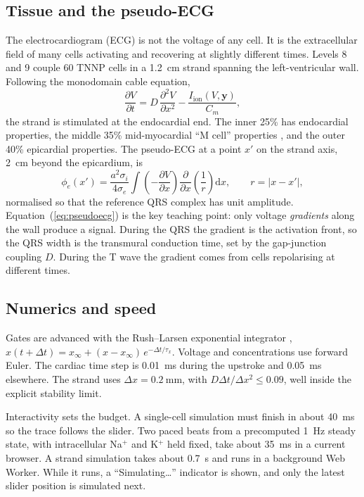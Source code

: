 \documentclass[11pt,a4paper]{article}
\begin{document}
\subsection{Tissue and the pseudo-ECG}
The electrocardiogram (ECG) is not the voltage of any cell. It is the extracellular field of many cells activating and recovering at slightly different times. Levels 8 and 9 couple 60 TNNP cells in a \SI{1.2}{\centi\metre} strand spanning the left-ventricular wall. Following the monodomain cable equation,
\begin{equation}
\frac{\partial V}{\partial t} = D\,\frac{\partial^2 V}{\partial x^2} - \frac{I_{\mathrm{ion}}(V,\mathbf{y})}{C_m},
\end{equation}
the strand is stimulated at the endocardial end. The inner 25\% has endocardial properties, the middle 35\% mid-myocardial ``M cell'' properties \cite{SicouriAntzelevitch1991}, and the outer 40\% epicardial properties. The pseudo-ECG at a point $x'$ on the strand axis, \SI{2}{\centi\metre} beyond the epicardium, is \cite{GimaRudy2002}
\begin{equation}
\phi_e(x') = \frac{a^2\sigma_i}{4\sigma_e}\int \left(-\frac{\partial V}{\partial x}\right)\frac{\partial}{\partial x}\!\left(\frac{1}{r}\right)\mathrm{d}x, \qquad r = |x - x'|,
\label{eq:pseudoecg}
\end{equation}
normalised so that the reference QRS complex has unit amplitude. Equation~(\ref{eq:pseudoecg}) is the key teaching point: only voltage \emph{gradients} along the wall produce a signal. During the QRS the gradient is the activation front, so the QRS width is the transmural conduction time, set by the gap-junction coupling $D$. During the T wave the gradient comes from cells repolarising at different times.

\subsection{Numerics and speed}
Gates are advanced with the Rush--Larsen exponential integrator \cite{RushLarsen1978},
$x(t+\Delta t) = x_\infty + (x - x_\infty)\,e^{-\Delta t/\tau_x}$. Voltage and concentrations use forward Euler. The cardiac time step is \SI{0.01}{\milli\second} during the upstroke and \SI{0.05}{\milli\second} elsewhere. The strand uses $\Delta x = \SI{0.2}{\milli\metre}$, with $D\Delta t/\Delta x^2 \le 0.09$, well inside the explicit stability limit.

Interactivity sets the budget. A single-cell simulation must finish in about \SI{40}{\milli\second} so the trace follows the slider. Two paced beats from a precomputed \SI{1}{\hertz} steady state, with intracellular Na$^+$ and K$^+$ held fixed, take about \SI{35}{\milli\second} in a current browser. A strand simulation takes about \SI{0.7}{\second} and runs in a background Web Worker. While it runs, a ``Simulating\ldots'' indicator is shown, and only the latest slider position is simulated next.
\end{document}
